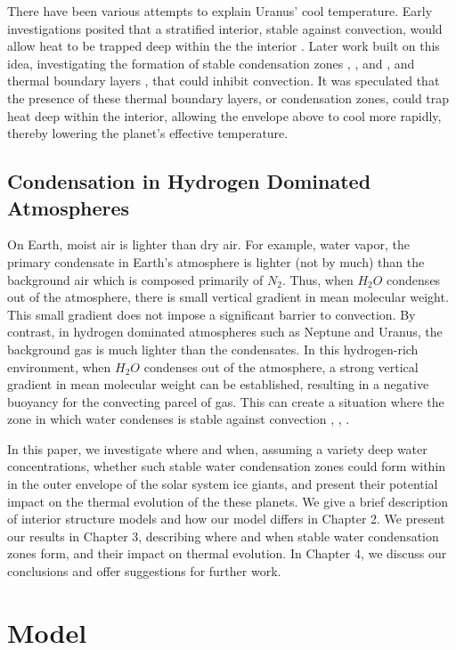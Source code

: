 \documentclass[11pt]{ucscthesisbs}
\begin{document}
There have been various attempts to explain Uranus' cool temperature. Early investigations posited that a stratified interior, stable against convection, would allow heat to be trapped deep within the the interior \citep{podolak_1991}. Later work built on this idea, investigating the formation of stable condensation zones \citep{friedson_2017}, \citep{leconte_2017}, and \citep{guillot_1995}, and thermal boundary layers \citep{nettelmann_2016}, that could inhibit convection. It was speculated that the presence of these thermal boundary layers, or condensation zones, could trap heat deep within the interior, allowing the envelope above to cool more rapidly, thereby lowering the planet's effective temperature.

\section{Condensation in Hydrogen Dominated Atmospheres}
On Earth, moist air is lighter than dry air. For example, water vapor, the primary condensate in Earth's atmosphere is lighter (not by much) than the background air which is composed primarily of $N_{2}$. Thus, when $H_{2}O$ condenses out of the atmosphere, there is small vertical gradient in mean molecular weight. This small gradient does not impose a significant barrier to convection. By contrast, in hydrogen dominated atmospheres such as Neptune and Uranus, the background gas is much lighter than the condensates. In this hydrogen-rich environment, when $H_{2}O$ condenses out of the atmosphere, a strong vertical gradient in mean molecular weight can be established, resulting in a negative buoyancy for the convecting parcel of gas. This can create a situation where the zone in which water condenses is stable against convection \citep{guillot_1995}, \citep{friedson_2017}, \citep{leconte_2017}. 

In this paper, we investigate where and when, assuming a variety deep water concentrations, whether such stable water condensation zones could form within in the outer envelope of the solar system ice giants, and present their potential impact on the thermal evolution of the these planets. We give a brief description of interior structure models and how our model differs in Chapter 2. We present our results in Chapter 3, describing where and when stable water condensation zones form, and their impact on thermal evolution. In Chapter 4, we discuss our conclusions and offer suggestions for further work.


\chapter{Model}
\end{document}
